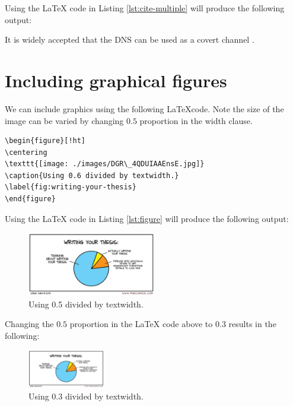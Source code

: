 Using the \LaTeX{} code in Listing \ref{lst:cite-multiple} will produce the following output:

\begin{mdframed}
It is widely accepted that the DNS can be used as a covert channel \citep{Born2010-do,Aiello2012-sg}.
\end{mdframed}

\section{Including graphical figures}\label{sec:first-section}
We can include graphics using the following \LaTeX code. Note the size of the image can be varied by changing $0.5$ proportion in the width clause.

\begin{lstlisting}[caption={Including a graphical figure}, numbers=none, label={lst:figure}]
\begin{figure}[!ht]
\centering
\texttt{[image: ./images/DGR\_4QDUIAAEnsE.jpg]}
\caption{Using 0.6 divided by textwidth.}
\label{fig:writing-your-thesis}
\end{figure}
\end{lstlisting}

Using the \LaTeX{} code in Listing \ref{lst:figure} will produce the following output:

\begin{figure}[!ht]
	\centering
	\includegraphics[width=0.5\textwidth]{./Figures/DGR_4QDUIAAEnsE.jpg}
	\caption{Using 0.5 divided by textwidth.}
	\label{fig:writing-your-thesis}
\end{figure}

Changing the $0.5$ proportion in the \LaTeX{} code above to $0.3$ results in the following:

\begin{figure}[!ht]
	\centering
	\includegraphics[width=0.3\textwidth]{./Figures/DGR_4QDUIAAEnsE.jpg}
	\caption{Using 0.3 divided by textwidth.}
	\label{fig:writing-your-thesis-smaller}
\end{figure}

